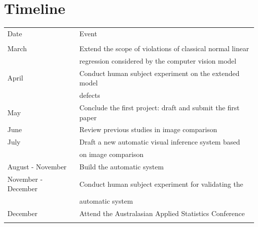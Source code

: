 \documentclass{monashthesis}
\theoremstyle{definition}
\theoremstyle{definition}
\theoremstyle{definition}
\theoremstyle{definition}
\theoremstyle{remark}
\begin{document}
\hypertarget{timeline}{%
\chapter{Timeline}\label{timeline}}

\begin{table} \label{tab:timeline}
\centering
\begin{tabular}[t]{ll}
\toprule
\addlinespace[0.5em]
Date & Event\\
\addlinespace[0.5em]
\midrule
\addlinespace[0.5em]
\multicolumn{2}{l}{\textit{\textbf{2022}}}\\
\hspace{4em}March & Extend the scope of violations of classical normal linear\\ 
\addlinespace[0.5em]
\hspace{4em} & regression considered by the computer vision model\\
\addlinespace[0.5em]
\hspace{4em}April & Conduct human subject experiment on the extended model\\ 
\addlinespace[0.5em]
\hspace{4em} & defects\\
\addlinespace[0.5em]
\hspace{4em}May & Conclude the first project: draft and submit the first paper\\
\addlinespace[0.5em]
\hspace{4em}June & Review previous studies in image comparison\\
\addlinespace[0.5em]
\hspace{4em}July & Draft a new automatic visual inference system based\\
\addlinespace[0.5em]
\hspace{4em} & on image comparison\\
\addlinespace[0.5em]
\hspace{4em}August - November & Build the automatic system\\
\addlinespace[0.5em]
\hspace{4em}November - December & Conduct human subject experiment for validating the\\
\addlinespace[0.5em]
\hspace{4em} & automatic system\\
\addlinespace[0.5em]
\hspace{4em}December & Attend the Australasian Applied Statistics Conference\\
\addlinespace[0.5em]

\end{tabular}
\end{table}
\end{document}
